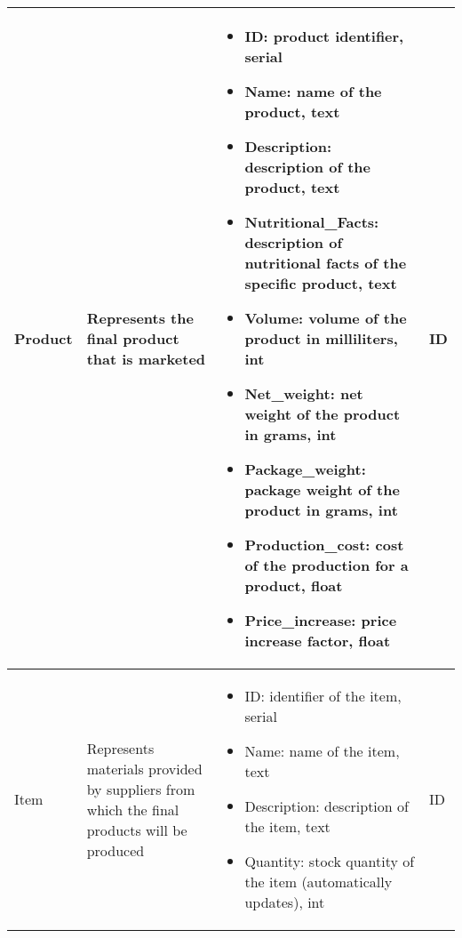 \begin{longtable}{|p{}|p{} |p{}|p{} |}
    Product & Represents the final product that is marketed &
    \begin{itemize}
        \vspace{-1em}
        \item ID:   product identifier, serial
        \item Name:   name of the product, text
        \item Description:   description of the product, text
        \item Nutritional\_Facts: description of nutritional facts of the specific product, text
        \item Volume:   volume of the product in milliliters, int
        \item Net\_weight:   net weight of the product in grams, int
        \item Package\_weight:   package weight of the product in grams, int
        \item Production\_cost:   cost of the production for a product, float
        \item Price\_increase:   price increase factor, float                         %
    \end{itemize}
    &  ID \\\hline

    Item & Represents materials provided by suppliers from which the final products will be produced &
    \begin{itemize}
        \vspace{-1em}
        \item ID:   identifier of the item, serial
        \item Name:   name of the item, text
        \item Description:   description of the item, text
        \item Quantity:   stock quantity of the item (automatically updates), int
    \end{itemize}
    &  ID \\\hline


\end{longtable}
